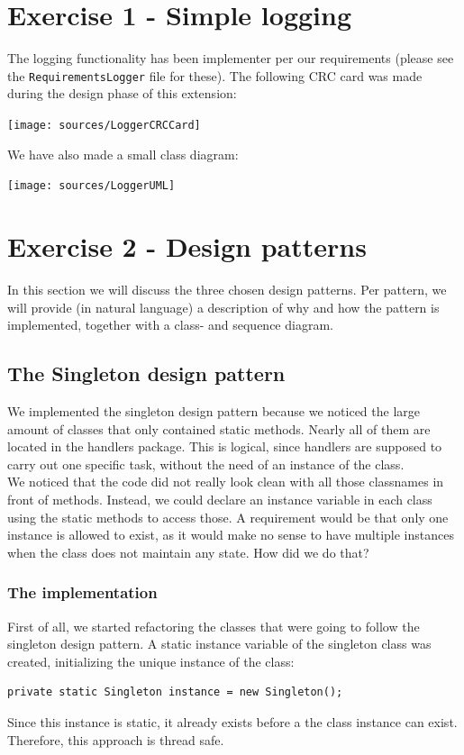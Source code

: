 \documentclass[a4paper,11pt,report]{scrartcl}
\begin{document}
\newpage\section{Exercise 1 - Simple logging}
The logging functionality has been implementer per our requirements (please see
the \texttt{RequirementsLogger} file for these). The following CRC card was made
during the design phase of this extension:\\

\centerline{\texttt{[image: sources/LoggerCRCCard]}}

We have also made a small class diagram:\\

\newpage\centerline{\texttt{[image: sources/LoggerUML]}}

\newpage\section{Exercise 2 - Design patterns}
In this section we will discuss the three chosen design patterns. Per pattern,
we will provide (in natural language) a description of why and how the pattern
is implemented, together with a class- and sequence diagram.

\subsection{The Singleton design pattern}
We implemented the singleton design pattern because we noticed the large amount
of classes that only contained static methods. Nearly all of them are located in
the handlers package. This is logical, since handlers are supposed to carry out
one specific task, without the need of an instance of the class. \\

We noticed that the code did not really look clean with all those classnames in
front of methods. Instead, we could declare an instance variable in each class
using the static methods to access those. A requirement would be that only one
instance is allowed to exist, as it would make no sense to have multiple
instances when the class does not maintain any state. How did we do that?

\subsubsection{The implementation}
First of all, we started refactoring the classes that were going to follow the
singleton design pattern. A static instance variable of the singleton class was
created, initializing the unique instance of the class:
\begin{verbatim}
private static Singleton instance = new Singleton();
\end{verbatim}
Since this instance is static, it already exists before a the class instance
can exist. Therefore, this approach is thread safe.\\
\end{document}
